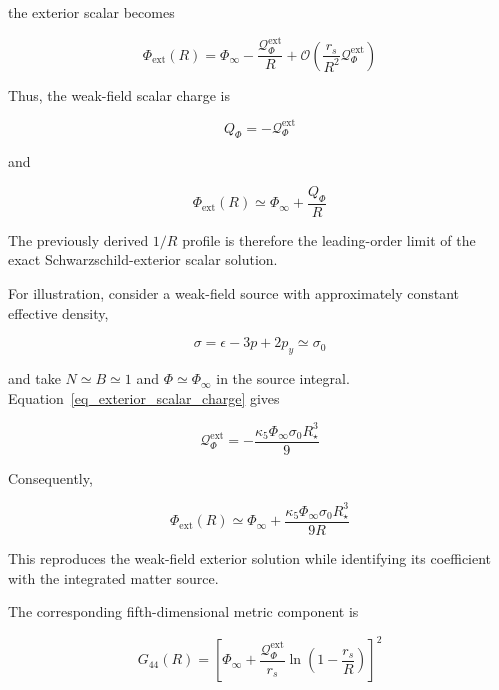 \documentclass[pdflatex,sn-mathphys-num]{sn-jnl}%
\theoremstyle{thmstyleone}%
\theoremstyle{thmstyletwo}%
\theoremstyle{thmstylethree}%
\begin{document}
the exterior scalar becomes

\begin{equation}
    \Phi_{\mathrm{ext}}(R)
    =
    \Phi_\infty
    -
    \frac{\mathcal Q_\Phi^{\mathrm{ext}}}{R}
    +
    \mathcal O\left(\frac{r_s}{R^2}\mathcal Q_\Phi^{\mathrm{ext}}\right)
\end{equation}

Thus, the weak-field scalar charge is

\begin{equation}
    Q_\Phi
    =
    -\mathcal Q_\Phi^{\mathrm{ext}}
\end{equation}

and

\begin{equation}
    \boxed{
    \Phi_{\mathrm{ext}}(R)
    \simeq
    \Phi_\infty+\frac{Q_\Phi}{R}
    }
    \label{eq_weak_field_exterior_scalar}
\end{equation}

The previously derived $1/R$ profile is therefore the leading-order limit of the exact Schwarzschild-exterior scalar solution.

For illustration, consider a weak-field source with approximately constant effective density,

\begin{equation}
    \sigma
    =
    \epsilon-3p+2p_y
    \simeq
    \sigma_0
\end{equation}

and take $N\simeq B\simeq1$ and $\Phi\simeq\Phi_\infty$ in the source integral. Equation~\eqref{eq_exterior_scalar_charge} gives

\begin{equation}
    \mathcal Q_\Phi^{\mathrm{ext}}
    =
    -\frac{\kappa_5\Phi_\infty\sigma_0R_\star^3}{9}
\end{equation}

Consequently,

\begin{equation}
    \boxed{
    \Phi_{\mathrm{ext}}(R)
    \simeq
    \Phi_\infty
    +
    \frac{\kappa_5\Phi_\infty\sigma_0R_\star^3}
    {9R}
    }
\end{equation}

This reproduces the weak-field exterior solution while identifying its coefficient with the integrated matter source.

The corresponding fifth-dimensional metric component is

\begin{equation}
    \boxed{
    G_{44}(R)
    =
    \left[
        \Phi_\infty
        +
        \frac{\mathcal Q_\Phi^{\mathrm{ext}}}{r_s}
        \ln\left(
            1-\frac{r_s}{R}
        \right)
    \right]^2
    }
    \label{eq_exact_exterior_g44}
\end{equation}
\end{document}

